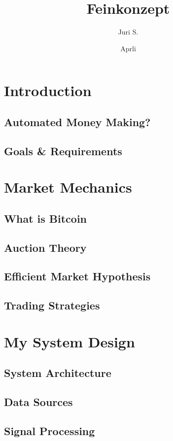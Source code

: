 \documentclass{article}
\title{Feinkonzept}
\author{Juri S.}
\date{Aprli}
\begin{document}
\tableofcontents

\setlength{\cftbeforesecskip}{10pt}
\setlength{\cftbeforesubsecskip}{5pt}

\section{Introduction}
\subsection{Automated Money Making?}
\subsection{Goals \& Requirements}


\section{Market Mechanics}
\subsection{What is Bitcoin}
\subsection{Auction Theory}
\subsection{Efficient Market Hypothesis}
\subsection{Trading Strategies}


\section{My System Design}
\subsection{System Architecture}
\subsection{Data Sources}
\subsection{Signal Processing}
\end{document}
